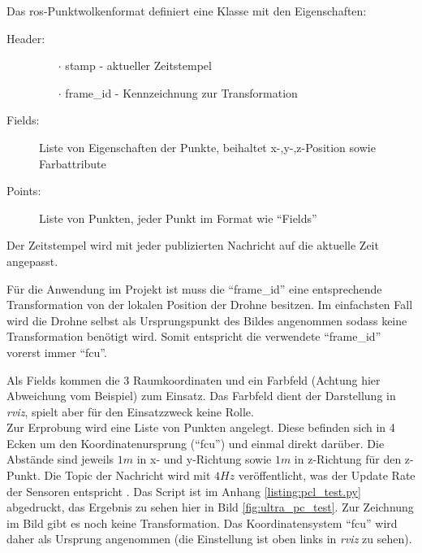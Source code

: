 Das \acrshort{ros}-Punktwolkenformat definiert eine Klasse mit den Eigenschaften:
\begin{description}
    \item[Header:]
    \begin{itemize}
        \item[]
        \item[$\cdot$] stamp - aktueller Zeitstempel
        \item[$\cdot$] frame\_id - Kennzeichnung zur Transformation
    \end{itemize}
    \item[Fields:] Liste von Eigenschaften der Punkte, beihaltet x-,y-,z-Position sowie Farbattribute
    \item[Points:] Liste von Punkten, jeder Punkt im Format wie \enquote{Fields}
\end{description}

Der Zeitstempel wird mit jeder publizierten Nachricht auf die aktuelle Zeit angepasst.

Für die Anwendung im Projekt ist muss die \enquote{frame\_id} eine entsprechende Transformation von der lokalen Position der Drohne besitzen. Im einfachsten Fall wird die Drohne selbst als Ursprungspunkt des Bildes angenommen sodass keine Transformation benötigt wird. Somit entspricht die verwendete \enquote{frame\_id} vorerst immer \enquote{fcu}.

Als Fields kommen die 3 Raumkoordinaten und ein Farbfeld (Achtung hier Abweichung vom Beispiel) zum Einsatz. Das Farbfeld dient der Darstellung in \textit{rviz}, spielt aber für den Einsatzzweck keine Rolle.\\

Zur Erprobung wird eine Liste von Punkten angelegt. Diese befinden sich in 4 Ecken um den Koordinatenursprung (\enquote{fcu}) und einmal direkt darüber. Die Abstände sind jeweils $1m$ in x- und y-Richtung sowie $1m$ in z-Richtung für den z-Punkt. Die Topic der Nachricht wird mit $4Hz$ veröffentlicht, was der Update Rate der Sensoren entspricht \cite[Kapitel 4.4]{markusreinErweiterungBestehenderDrohnen2023}. Das Script ist im Anhang \ref{listing:pcl_test.py} abgedruckt, das Ergebnis zu sehen hier in Bild \ref{fig:ultra_pc_test}. Zur Zeichnung im Bild gibt es noch keine Transformation. Das Koordinatensystem \enquote{fcu} wird daher als Ursprung angenommen (die Einstellung ist oben links in \textit{rviz} zu sehen).

